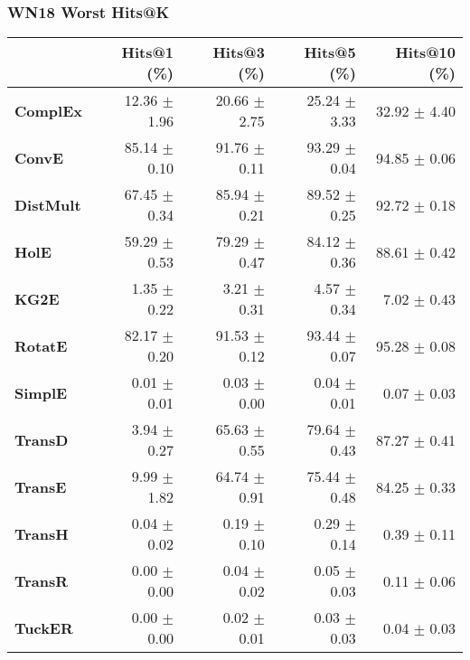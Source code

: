 \documentclass{article}
\begin{document}
\subsubsection{WN18 Worst Hits@K}
    \begin{center}
    \begin{tabular}{lrrrr}
\toprule
{} &   Hits@1 (\%) &   Hits@3 (\%) &   Hits@5 (\%) &  Hits@10 (\%) \\
\midrule
\textbf{ComplEx } &  12.36 $\pm$ 1.96 &  20.66 $\pm$ 2.75 &  25.24 $\pm$ 3.33 &  32.92 $\pm$ 4.40 \\
\textbf{ConvE   } &  85.14 $\pm$ 0.10 &  91.76 $\pm$ 0.11 &  93.29 $\pm$ 0.04 &  94.85 $\pm$ 0.06 \\
\textbf{DistMult} &  67.45 $\pm$ 0.34 &  85.94 $\pm$ 0.21 &  89.52 $\pm$ 0.25 &  92.72 $\pm$ 0.18 \\
\textbf{HolE    } &  59.29 $\pm$ 0.53 &  79.29 $\pm$ 0.47 &  84.12 $\pm$ 0.36 &  88.61 $\pm$ 0.42 \\
\textbf{KG2E    } &  $\phantom{5}$1.35 $\pm$ 0.22 &  $\phantom{5}$3.21 $\pm$ 0.31 &  $\phantom{5}$4.57 $\pm$ 0.34 &  $\phantom{5}$7.02 $\pm$ 0.43 \\
\textbf{RotatE  } &  82.17 $\pm$ 0.20 &  91.53 $\pm$ 0.12 &  93.44 $\pm$ 0.07 &  95.28 $\pm$ 0.08 \\
\textbf{SimplE  } &  $\phantom{5}$0.01 $\pm$ 0.01 &  $\phantom{5}$0.03 $\pm$ 0.00 &  $\phantom{5}$0.04 $\pm$ 0.01 &  $\phantom{5}$0.07 $\pm$ 0.03 \\
\textbf{TransD  } &  $\phantom{5}$3.94 $\pm$ 0.27 &  65.63 $\pm$ 0.55 &  79.64 $\pm$ 0.43 &  87.27 $\pm$ 0.41 \\
\textbf{TransE  } &  $\phantom{5}$9.99 $\pm$ 1.82 &  64.74 $\pm$ 0.91 &  75.44 $\pm$ 0.48 &  84.25 $\pm$ 0.33 \\
\textbf{TransH  } &  $\phantom{5}$0.04 $\pm$ 0.02 &  $\phantom{5}$0.19 $\pm$ 0.10 &  $\phantom{5}$0.29 $\pm$ 0.14 &  $\phantom{5}$0.39 $\pm$ 0.11 \\
\textbf{TransR  } &  $\phantom{5}$0.00 $\pm$ 0.00 &  $\phantom{5}$0.04 $\pm$ 0.02 &  $\phantom{5}$0.05 $\pm$ 0.03 &  $\phantom{5}$0.11 $\pm$ 0.06 \\
\textbf{TuckER  } &  $\phantom{5}$0.00 $\pm$ 0.00 &  $\phantom{5}$0.02 $\pm$ 0.01 &  $\phantom{5}$0.03 $\pm$ 0.03 &  $\phantom{5}$0.04 $\pm$ 0.03 \\
\bottomrule
\end{tabular}

    \end{center}
\end{document}
